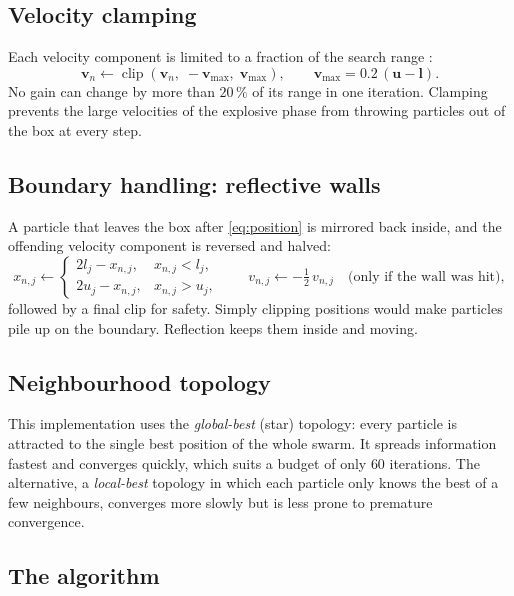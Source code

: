 \documentclass[11pt,a4paper]{article}
\newcommand{\clip}{\operatorname{clip}}
\begin{document}
\subsection{Velocity clamping}

Each velocity component is limited to a fraction of the search range \cite{eberhart2000}:
\begin{equation}
\bm v_n \leftarrow \clip\!\left(\bm v_n,\; -\bm v_{\max},\; \bm v_{\max}\right),\qquad
\bm v_{\max} = 0.2\,(\bm u - \bm l).
\end{equation}
No gain can change by more than $20\,\%$ of its range in one iteration. Clamping prevents the large
velocities of the explosive phase from throwing particles out of the box at every step.

\subsection{Boundary handling: reflective walls}

A particle that leaves the box after \eqref{eq:position} is mirrored back inside, and the offending
velocity component is reversed and halved:
\begin{equation}
x_{n,j} \leftarrow
\begin{cases}
2l_j - x_{n,j}, & x_{n,j} < l_j,\\
2u_j - x_{n,j}, & x_{n,j} > u_j,
\end{cases}
\qquad v_{n,j} \leftarrow -\tfrac12\,v_{n,j}\quad\text{(only if the wall was hit)},
\end{equation}
followed by a final clip for safety. Simply clipping positions would make particles pile up on the
boundary. Reflection keeps them inside and moving.

\subsection{Neighbourhood topology}

This implementation uses the \emph{global-best} (star) topology: every particle is attracted to the single
best position of the whole swarm. It spreads information fastest and converges quickly, which suits a
budget of only $60$ iterations. The alternative, a \emph{local-best} topology in which each particle only
knows the best of a few neighbours, converges more slowly but is less prone to premature convergence.

\subsection{The algorithm}
\end{document}
